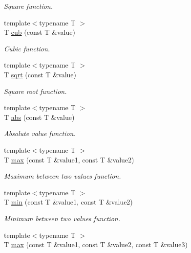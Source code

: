 \begin{DoxyCompactItemize}
\begin{DoxyCompactList}\small\item\em Square function. \end{DoxyCompactList}\item 
{\footnotesize template$<$typename T $>$ }\\T \hyperlink{namespaceacme_af15f05bfabb3a12f9c95cc8f63a00425}{cub} (const T \&value)
\begin{DoxyCompactList}\small\item\em Cubic function. \end{DoxyCompactList}\item 
{\footnotesize template$<$typename T $>$ }\\T \hyperlink{namespaceacme_a6727bc4e9b202cb40e59065a01d9368b}{sqrt} (const T \&value)
\begin{DoxyCompactList}\small\item\em Square root function. \end{DoxyCompactList}\item 
{\footnotesize template$<$typename T $>$ }\\T \hyperlink{namespaceacme_add7b88267b101300f6818a0ed6dacf2a}{abs} (const T \&value)
\begin{DoxyCompactList}\small\item\em Absolute value function. \end{DoxyCompactList}\item 
{\footnotesize template$<$typename T $>$ }\\T \hyperlink{namespaceacme_abc0dd1e2a5441a08af324075636ea74a}{max} (const T \&value1, const T \&value2)
\begin{DoxyCompactList}\small\item\em Maximum between two values function. \end{DoxyCompactList}\item 
{\footnotesize template$<$typename T $>$ }\\T \hyperlink{namespaceacme_a8e3d214c67f792ca4deef35481ea8b12}{min} (const T \&value1, const T \&value2)
\begin{DoxyCompactList}\small\item\em Minimum between two values function. \end{DoxyCompactList}\item 
{\footnotesize template$<$typename T $>$ }\\T \hyperlink{namespaceacme_aca4726ee714290f5715f97242fd61cea}{max} (const T \&value1, const T \&value2, const T \&value3)

\end{DoxyCompactItemize}
